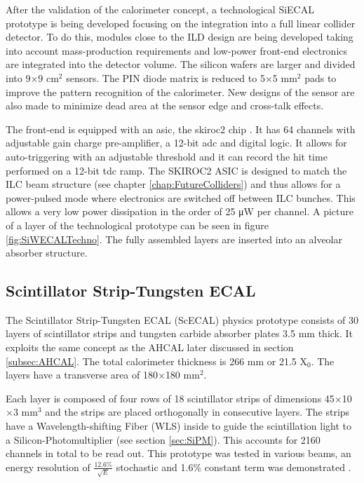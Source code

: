 After the validation of the calorimeter concept, a technological SiECAL prototype is being developed focusing on the integration into a full linear collider detector. To do this, modules close to the ILD design are being developed taking into account mass-production requirements and low-power front-end electronics are integrated into the detector volume. The silicon wafers are larger and divided into 9$\times$9 cm$^2$ sensors. The PIN diode matrix is reduced to 5$\times$5 mm$^2$ pads to improve the pattern recognition of the calorimeter. New designs of the sensor are also made to minimize dead area at the sensor edge and cross-talk effects.

The front-end is equipped with an \acrshort{asic}, the \acrshort{skiroc2} chip \cite{1748-0221-6-12-C12040}. It has 64 channels with adjustable gain charge pre-amplifier, a 12-bit \acrshort{adc} and digital logic. It allows for auto-triggering with an adjustable threshold and it can record the hit time performed on a 12-bit \acrshort{tdc} ramp. The SKIROC2 ASIC is designed to match the ILC beam structure (see chapter \ref{chap:FutureColliders}) and thus allows for a power-pulsed mode where electronics are switched off between ILC bunches. This allows a very low power dissipation in the order of 25 \si{\micro\watt} per channel. A picture of a layer of the technological prototype can be seen in figure \ref{fig:SiWECALTechno}. The fully assembled layers are inserted into an alveolar absorber structure.

\subsection{Scintillator Strip-Tungsten ECAL}
\label{subsec:ScECAL}

The Scintillator Strip-Tungsten ECAL (ScECAL) physics prototype \cite{1707.07126v2} consists of 30 layers of scintillator strips and tungsten carbide absorber plates 3.5 mm thick. It exploits the same concept as the AHCAL later discussed in section \ref{subsec:AHCAL}. The total calorimeter thickness is 266 mm or 21.5 X$_0$. The layers have a transverse area of 180$\times$180 mm$^2$.

Each layer is composed of four rows of 18 scintillator strips of dimensions 45$\times$10$\times$3 mm$^3$ and the strips are placed orthogonally in consecutive layers. The strips have a Wavelength-shifting Fiber (WLS) inside to guide the scintillation light to a Silicon-Photomultiplier (see section \ref{sec:SiPM}). This accounts for 2160 channels in total to be read out. This prototype was tested in various beams, an energy resolution of $\frac{12.6\%}{\sqrt{E}}$ stochastic and 1.6\% constant term was demonstrated \cite{1707.07126v2}.

